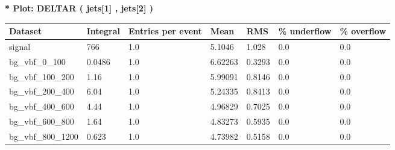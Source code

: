 \documentclass[a4paper, 10pt]{article}
\begin{document}
\textbf{* Plot: DELTAR ( jets[1] , jets[2] ) }\\
   \begin{table}[H]
  \begin{center}
    \begin{tabular}{|m{23.0mm}|m{23.0mm}|m{18.0mm}|m{19.0mm}|m{19.0mm}|m{19.0mm}|m{19.0mm}|}
      \hline
      {\cellcolor{yellow}         Dataset}& {\cellcolor{yellow}         Integral}& {\cellcolor{yellow}         Entries per event}& {\cellcolor{yellow}         Mean}& {\cellcolor{yellow}         RMS}& {\cellcolor{yellow}         \% underflow}& {\cellcolor{yellow}         \% overflow}\\
      \hline
      {\cellcolor{white}         signal}& {\cellcolor{white}         766}& {\cellcolor{white}         1.0}& {\cellcolor{white}         5.1046}& {\cellcolor{white}         1.028}& {\cellcolor{green}         0.0}& {\cellcolor{green}         0.0}\\
      \hline
      {\cellcolor{white}         bg\_vbf\_0\_100}& {\cellcolor{white}         0.0486}& {\cellcolor{white}         1.0}& {\cellcolor{white}         6.62263}& {\cellcolor{white}         0.3293}& {\cellcolor{green}         0.0}& {\cellcolor{green}         0.0}\\
      \hline
      {\cellcolor{white}         bg\_vbf\_100\_200}& {\cellcolor{white}         1.16}& {\cellcolor{white}         1.0}& {\cellcolor{white}         5.99091}& {\cellcolor{white}         0.8146}& {\cellcolor{green}         0.0}& {\cellcolor{green}         0.0}\\
      \hline
      {\cellcolor{white}         bg\_vbf\_200\_400}& {\cellcolor{white}         6.04}& {\cellcolor{white}         1.0}& {\cellcolor{white}         5.24335}& {\cellcolor{white}         0.8413}& {\cellcolor{green}         0.0}& {\cellcolor{green}         0.0}\\
      \hline
      {\cellcolor{white}         bg\_vbf\_400\_600}& {\cellcolor{white}         4.44}& {\cellcolor{white}         1.0}& {\cellcolor{white}         4.96829}& {\cellcolor{white}         0.7025}& {\cellcolor{green}         0.0}& {\cellcolor{green}         0.0}\\
      \hline
      {\cellcolor{white}         bg\_vbf\_600\_800}& {\cellcolor{white}         1.64}& {\cellcolor{white}         1.0}& {\cellcolor{white}         4.83273}& {\cellcolor{white}         0.5935}& {\cellcolor{green}         0.0}& {\cellcolor{green}         0.0}\\
      \hline
      {\cellcolor{white}         bg\_vbf\_800\_1200}& {\cellcolor{white}         0.623}& {\cellcolor{white}         1.0}& {\cellcolor{white}         4.73982}& {\cellcolor{white}         0.5158}& {\cellcolor{green}         0.0}& {\cellcolor{green}         0.0}\\

\end{tabular}
\end{center}
\end{table}
\end{document}
